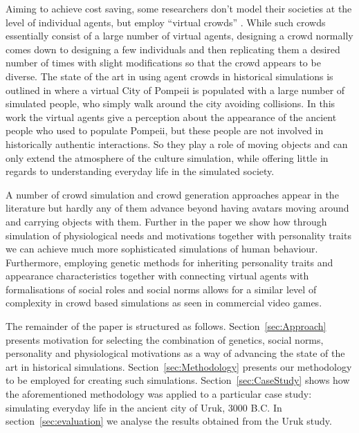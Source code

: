 \documentclass[graybox]{svmult}
\begin{document}
Aiming to achieve cost saving, some researchers don't model their societies at the level of individual agents, but employ ``virtual crowds'' \cite{Colosseum_crowds}. While such crowds essentially consist of a large number of virtual agents, designing a crowd normally comes down to designing a few individuals and then replicating them a desired number of times with slight modifications so that the crowd appears to be diverse. The state of the art in using agent crowds in historical simulations is outlined in \cite{heritage_pompeii} where a virtual City of Pompeii is populated with a large number of simulated people, who simply walk around the city avoiding collisions. In this work the virtual agents give a perception about the appearance of the ancient people who used to populate Pompeii, but these people are not involved in historically authentic interactions. So they play a role of moving objects and can only extend the atmosphere of the culture simulation, while offering little in regards to understanding everyday life in the simulated society.

A number of crowd simulation and crowd generation approaches appear in the literature but hardly any of them advance beyond having avatars moving around and carrying objects with them.  Further in the paper we show how through simulation of physiological needs and motivations together with personality traits we can achieve much more sophisticated simulations of human behaviour. Furthermore, employing genetic methods for inheriting personality traits and appearance characteristics together with connecting virtual agents with formalisations of social roles and social norms allows for a similar level of complexity in crowd based simulations as seen in commercial video games.

The remainder of the paper is structured as follows. Section~\ref{sec:Approach} presents motivation for selecting the combination of genetics, social norms, personality and physiological motivations as a way of advancing the state of the art in historical simulations. Section~\ref{sec:Methodology} presents our methodology to be employed for creating such simulations. Section~\ref{sec:CaseStudy} shows how the aforementioned methodology was applied to a particular case study: simulating everyday life in the ancient city of Uruk, 3000 B.C. In section~\ref{sec:evaluation} we analyse the results obtained from the Uruk study. %
 
\end{document}
